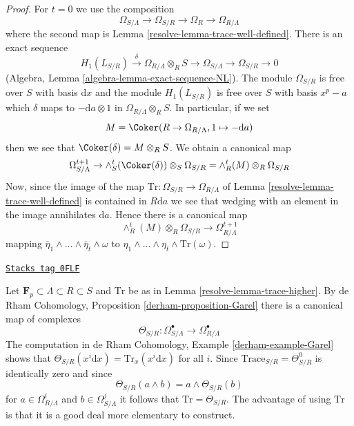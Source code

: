 \begin{proof}

For $t = 0$ we use the composition
$$
\Omega_{S/\Lambda} \to \Omega_{S/R} \to \Omega_R \to \Omega_{R/\Lambda}
$$
where the second map is Lemma \ref{resolve-lemma-trace-well-defined}.
There is an exact sequence
$$
H_1(L_{S/R}) \xrightarrow{\delta} \Omega_{R/\Lambda} \otimes_R S \to
\Omega_{S/\Lambda} \to \Omega_{S/R} \to 0
$$
(Algebra, Lemma \ref{algebra-lemma-exact-sequence-NL}).
The module $\Omega_{S/R}$ is free over $S$ with basis $\text{d}x$
and the module $H_1(L_{S/R})$ is free over $S$ with basis $x^p - a$
which $\delta$ maps to $-\text{d}a \otimes 1$ in
$\Omega_{R/\Lambda} \otimes_R S$. In particular, if we set
$$
M = \Coker(R \to \Omega_{R/\Lambda}, 1 \mapsto -\text{d}a)
$$
then we see that $\Coker(\delta) = M \otimes_R S$. We obtain a
canonical map
$$
\Omega^{t + 1}_{S/\Lambda} \to
\wedge_S^t(\Coker(\delta)) \otimes_S \Omega_{S/R} =
\wedge^t_R(M) \otimes_R \Omega_{S/R}
$$
Now, since the image of the map
$\text{Tr} : \Omega_{S/R} \to \Omega_{R/\Lambda}$
of Lemma \ref{resolve-lemma-trace-well-defined} is contained in $R\text{d}a$ we
see that wedging with an element in the image annihilates $\text{d}a$.
Hence there is a canonical map
$$
\wedge^t_R(M) \otimes_R \Omega_{S/R} \to \Omega_{R/\Lambda}^{t + 1}
$$
mapping
$\overline{\eta}_1 \wedge \ldots \wedge \overline{\eta}_t \wedge \omega$
to $\eta_1 \wedge \ldots \wedge \eta_t \wedge \text{Tr}(\omega)$.
\end{proof}

\begin{remark}
\label{resolve-remark-compare-Garel}
\href{https://stacks.math.columbia.edu/tag/0FLF}{\texttt{Stacks tag 0FLF}}

Let $\mathbf{F}_p \subset \Lambda \subset R \subset S$ and $\text{Tr}$
be as in Lemma \ref{resolve-lemma-trace-higher}. By
de Rham Cohomology, Proposition \ref{derham-proposition-Garel}
there is a canonical map of complexes
$$
\Theta_{S/R} :
\Omega_{S/\Lambda}^\bullet
\longrightarrow
\Omega_{R/\Lambda}^\bullet
$$
The computation in de Rham Cohomology, Example \ref{derham-example-Garel}
shows that $\Theta_{S/R}(x^i \text{d}x) = \text{Tr}_x(x^i\text{d}x)$
for all $i$. Since $\text{Trace}_{S/R} = \Theta^0_{S/R}$
is identically zero and since
$$
\Theta_{S/R}(a \wedge b) = a \wedge \Theta_{S/R}(b)
$$
for $a \in \Omega^i_{R/\Lambda}$ and $b \in \Omega^j_{S/\Lambda}$
it follows that $\text{Tr} = \Theta_{S/R}$. The advantage of using $\text{Tr}$
is that it is a good deal more elementary to construct.
\end{remark}

